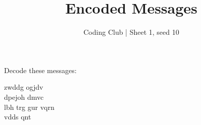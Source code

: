 \documentclass{article}
\title{Encoded Messages}
\author{Coding Club | Sheet 1, seed 10}
\begin{document}
	
	\maketitle

	\noindent{}Decode these messages:

	\noindent{}zwddg ogjdv \\[0.7in] \noindent{}dpejoh dmvc \\[0.7in] \noindent{}lbh trg gur vqrn \\[0.7in] \noindent{}vdds qnt
	
\end{document}
